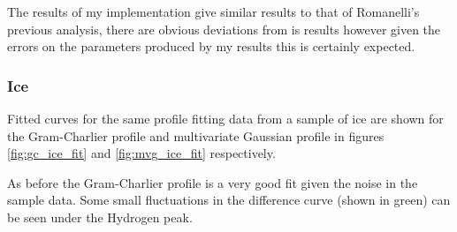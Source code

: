 \documentclass[a4paper]{article}
\begin{document}
The results of my implementation give similar results to that of Romanelli's
previous analysis, there are obvious deviations from is results however given
the errors on the parameters produced by my results this is certainly expected.

\subsubsection{Ice}

Fitted curves for the same profile fitting data from a sample of ice are shown
for the Gram-Charlier profile and multivariate Gaussian profile in figures
\ref{fig:gc_ice_fit} and \ref{fig:mvg_ice_fit} respectively.

As before the Gram-Charlier profile is a very good fit given the noise in the
sample data. Some small fluctuations in the difference curve (shown in green)
can be seen under the Hydrogen peak.
\end{document}
